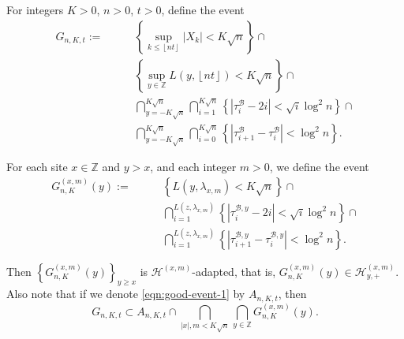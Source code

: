 \documentclass[twoside,12pt,a4paper]{article}
\numberwithin{equation}{section}
\begin{document}
		For integers $K>0$, $n > 0$, $t>0$, define the event
\begin{align}
	G_{n,K,t} :=  \qquad
		\label{eqn:good-event-1}
		& \left\{\sup _{k \le \left\lfloor nt  \right\rfloor} |X_k| < K \sqrt{n} \right\} \cap \\
		\label{eqn:good-event-2}
		& \left\{\sup_{y \in \mathbb{Z}} L(y, \left\lfloor nt  \right\rfloor) < K \sqrt{n} \right\} \cap \\
		\label{eqn:good-event-3}
		& \bigcap_{y = - K \sqrt{n} }^{K \sqrt{n}} 
		\bigcap_{i = 1}^{K \sqrt{n} } \left\{\left| \tau_i^{\mathcal{B}} - 2 i \right| < \sqrt{ i } \log^2 n \right\}  \cap \\
		\label{eqn:good-event-4}
		& \bigcap_{y = - K \sqrt{n} }^{K \sqrt{n}} 
		\bigcap_{i = 0}^{K \sqrt{n} } \left\{\left| \tau_{i+1}^{\mathcal{B}} - \tau_i^{\mathcal{B}} \right| < \log^2 n \right\}  
.\end{align}

For each site $x \in \mathbb{Z}$ and $y > x$, and each integer $m > 0$, we define the event
\begin{align}
	G_{n,K}^{(x,m)}(y) :=  \qquad
		& \left\{ L(y,  \lambda_{x, m}  ) < K \sqrt{n} \right\} \cap \\
		& \bigcap_{i = 1}^{L(z, \lambda_{x, m}) } \left\{\left| \tau_i^{\mathcal{B}, y} - 2 i \right| < \sqrt{ i } \log^2 n \right\}  \cap \\
		& \bigcap_{i = 1}^{L(z, \lambda_{x, m}) } \left\{\left| \tau_{i+1}^{\mathcal{B},y} - \tau_i^{\mathcal{B},y} \right| < \log^2 n \right\}  
.\end{align}

Then  $\left\{G_{n, K}^{(x,m)}(y)\right\}_{y \ge x}$ is $\mathcal{H}^{(x,m)}$-adapted, that is, $G_{n, K}^{(x,m)}(y)\in \mathcal{H}_{y, +}^{(x,m)}$.
Also note that  if we denote \eqref{eqn:good-event-1} by $A_{n, K, t}$, then
	\begin{equation}
		\label{eqn:goodgood}
		G_{n, K, t} \subset  A_{n, K, t} \cap 
		\bigcap_{|x|, m < K \sqrt{n} } \bigcap_{y \in \mathbb{Z}} G_{n, K}^{(x,m)}(y)
	.\end{equation} 
\end{document}
